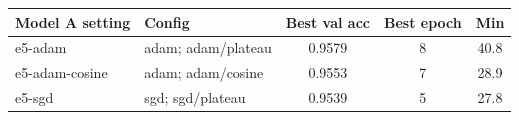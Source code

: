 \begin{tabular}{llccc}
\toprule
Model A setting & Config & Best val acc & Best epoch & Min \\
\midrule
e5-adam & adam; adam/plateau & 0.9579 & 8 & 40.8\\
e5-adam-cosine & adam; adam/cosine & 0.9553 & 7 & 28.9\\
e5-sgd & sgd; sgd/plateau & 0.9539 & 5 & 27.8 \\
\bottomrule
\end{tabular}
